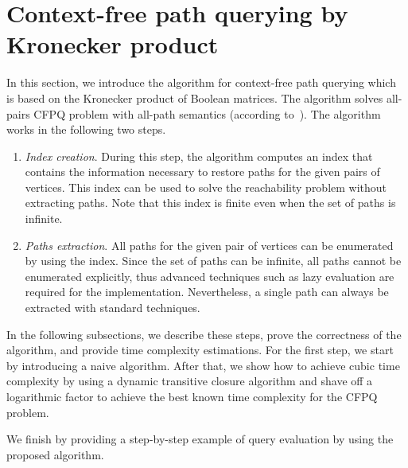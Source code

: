 \section{Context-free path querying by Kronecker product}


In this section, we introduce the algorithm for context-free path querying which is based on the Kronecker product of Boolean matrices.
The algorithm solves all-pairs CFPQ problem with all-path semantics (according to~\cite{hellingsPathQuerying}).
The algorithm works in the following two steps.
\begin{enumerate}
\item \emph{Index creation}.
 During this step, the algorithm computes an index that contains the information necessary to restore paths for the given pairs of vertices.
 This index can be used to solve the reachability problem without extracting paths.
 Note that this index is finite even when the set of paths is infinite.
\item \emph{Paths extraction}.
All paths for the given pair of vertices can be enumerated by using the index.
Since the set of paths can be infinite, all paths cannot be enumerated explicitly, thus advanced techniques such as lazy evaluation are required for the implementation.
Nevertheless, a single path can always be extracted with standard techniques.
\end{enumerate}

In the following subsections, we describe these steps, prove the correctness of the algorithm, and provide time complexity estimations.
For the first step, we start by introducing a naive algorithm.
After that, we show how to achieve cubic time complexity by using a dynamic transitive closure algorithm and shave off a logarithmic factor to achieve the best known time complexity for the CFPQ problem.

We finish by providing a step-by-step example of query evaluation by using the proposed algorithm.



